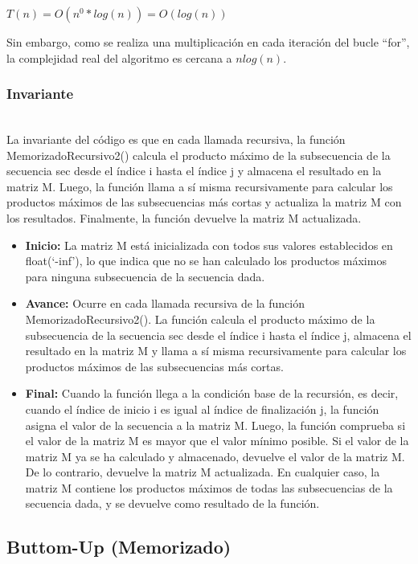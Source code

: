 \documentclass[11pt]{article}
\providecommand{\tightlist}{%
      \setlength{\itemsep}{0pt}\setlength{\parskip}{0pt}}
\begin{document}
\(T(n) = O(n^0 * log(n)) = O(log(n))\)

Sin embargo, como se realiza una multiplicación en cada iteración del
bucle ``for'', la complejidad real del algoritmo es cercana a
\(n log(n)\).

\hypertarget{invariante}{%
\subsubsection{Invariante}\label{invariante}}\\

La invariante del código es que en cada llamada recursiva, la función
MemorizadoRecursivo2() calcula el producto máximo de la subsecuencia de
la secuencia sec desde el índice i hasta el índice j y almacena el
resultado en la matriz M. Luego, la función llama a sí misma
recursivamente para calcular los productos máximos de las subsecuencias
más cortas y actualiza la matriz M con los resultados. Finalmente, la
función devuelve la matriz M actualizada.

\begin{itemize}
\tightlist
\item
  \textbf{Inicio:} La matriz M está inicializada con todos sus valores
  establecidos en float(`-inf'), lo que indica que no se han calculado
  los productos máximos para ninguna subsecuencia de la secuencia dada.
\item
  \textbf{Avance:} Ocurre en cada llamada recursiva de la función
  MemorizadoRecursivo2(). La función calcula el producto máximo de la
  subsecuencia de la secuencia sec desde el índice i hasta el índice j,
  almacena el resultado en la matriz M y llama a sí misma recursivamente
  para calcular los productos máximos de las subsecuencias más cortas.
\item
  \textbf{Final:} Cuando la función llega a la condición base de la
  recursión, es decir, cuando el índice de inicio i es igual al índice
  de finalización j, la función asigna el valor de la secuencia a la
  matriz M. Luego, la función comprueba si el valor de la matriz M es
  mayor que el valor mínimo posible. Si el valor de la matriz M ya se ha
  calculado y almacenado, devuelve el valor de la matriz M. De lo
  contrario, devuelve la matriz M actualizada. En cualquier caso, la
  matriz M contiene los productos máximos de todas las subsecuencias de
  la secuencia dada, y se devuelve como resultado de la función.
\end{itemize}


\hypertarget{buttom-up-memorizado}{%
\subsection{Buttom-Up (Memorizado)}\label{buttom-up-memorizado}}
\end{document}
